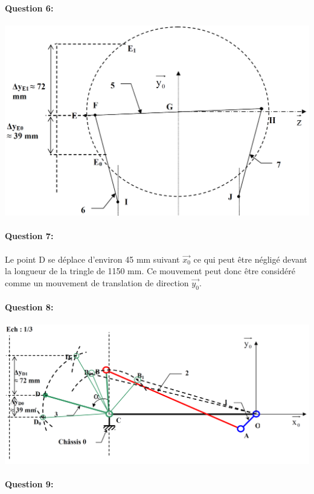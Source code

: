 \paragraph{Question 6:}

\begin{center}
 \includegraphics[width=0.8\linewidth]{img/chaudiere_geom_cor_2}
\end{center}

\paragraph{Question 7:}

Le point D se déplace d'environ 45 mm suivant $\overrightarrow{x_0}$ ce qui peut être négligé devant la longueur de la tringle de 1150 mm. Ce mouvement peut donc être considéré comme un mouvement de translation de direction $\overrightarrow{y_0}$.


\paragraph{Question 8:}

\begin{center}
 \includegraphics[width=0.8\linewidth]{img/chaudiere_geom_cor}
\end{center}


\paragraph{Question 9:}


